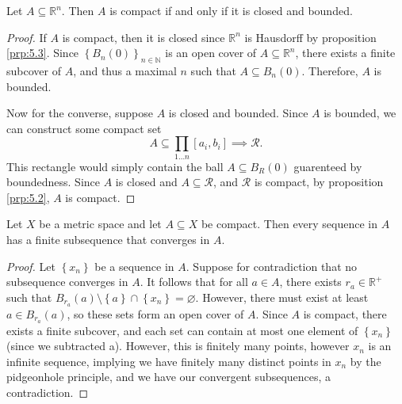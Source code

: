 \begin{proposition}\label{prp:5.6}
	Let $A\subseteq \mathbb{R} ^n$. Then $A$ is compact if and only if it is closed and bounded.
\end{proposition}
\begin{proof}
	If $A$ is compact, then it is closed since $\mathbb{R} ^n$ is Hausdorff by proposition \ref{prp:5.3}. Since $\left\{ B_n(0) \right\}_{n\in\mathbb{N} } $ is an open cover of $A\subseteq \mathbb{R} ^n$, there exists a finite subcover of $A$, and thus a maximal $n$ such that $A\subseteq B_n(0)$. Therefore, $A$ is bounded.

	Now for the converse, suppose $A$ is closed and bounded. Since $A$ is bounded, we can construct some compact set
	\[
		A\subseteq \prod_{1\ldots n} [a_i,b_i]\implies \mathcal{R} 
	.\]
	This rectangle would simply contain the ball $A\subseteq B_R(0)$ guarenteed by boundedness. Since $A$ is closed and $A\subseteq \mathcal{R} $, and $\mathcal{R} $ is compact, by proposition \ref{prp:5.2}, $A$ is compact.
\end{proof}
\begin{proposition}\label{prp:5.7}
	Let $X$ be a metric space and let $A\subseteq X$ be compact. Then every sequence in $A$ has a finite subsequence that converges in $A$.
\end{proposition}
\begin{proof}
	Let $\left\{ x_n \right\}$ be a sequence in $A$. Suppose for contradiction that no subsequence converges in $A$. It follows that for all $a\in A$, there exists $r_a\in\mathbb{R} ^+$ such that $B_{r_a} (a)\setminus \left\{ a \right\}\cap \left\{ x_n \right\}  =\varnothing $. However, there must exist at least $a\in B_{r_a} (a)$, so these sets form an open cover of $A$. Since $A$ is compact, there exists a finite subcover, and each set can contain at most one element of $\left\{ x_n \right\} $ (since we subtracted a). However, this is finitely many points, however $x_n$ is an infinite sequence, implying we have finitely many distinct points in $x_n$ by the pidgeonhole principle, and we have our convergent subsequences, a contradiction.
\end{proof}

